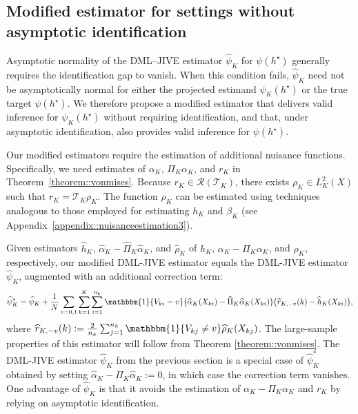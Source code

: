 \documentclass[11pt]{article}
\theoremstyle{plain}
\theoremstyle{definition}
\theoremstyle{remark}
\theoremstyle{definition}
\begin{document}
 


  
 


\subsection{Modified estimator for settings without asymptotic identification}
\label{sec::estimators2}

Asymptotic normality of the DML--JIVE estimator $\widehat{\psi}_K$ for $\psi(h^\star)$ generally requires the identification gap to vanish. When this condition fails, $\widehat{\psi}_K$ need not be asymptotically normal for either the projected estimand $\psi_K(h^\star)$ or the true target $\psi(h^\star)$. We therefore propose a modified estimator that delivers valid inference for $\psi_K(h^\star)$ without requiring identification, and that, under asymptotic identification, also provides valid inference for $\psi(h^\star)$.


Our modified estimators require the estimation of additional nuisance functions. Specifically, we need estimates of \( \alpha_K \), \( \Pi_K \alpha_K \), and \( r_K \) in Theorem~\ref{theorem::vonmises}. Because \( r_K \in \mathcal{R}(\mathcal{T}_K) \), there exists \( \rho_K \in L^2_K(X) \) such that \( r_K = \mathcal{T}_K \rho_K \). The function \( \rho_K \) can be estimated using techniques analogous to those employed for estimating \( h_K \) and \( \beta_K \) (see Appendix~\ref{appendix::nuisanceestimation3}).

 
Given estimators \( \widehat{h}_K \), \( \widehat{\alpha}_K - \widehat{\Pi}_K \widehat{\alpha}_K \), and \( \widehat{\rho}_K \) of \( h_K \), \( \alpha_K - \Pi_K \alpha_K \), and \( \rho_K \), respectively, our modified DML-JIVE estimator equals the DML-JIVE estimator \( \widehat{\psi}_K \), augmented with an additional correction term:
\begin{align*}
  \widehat{\psi}_K^*
  = \widehat{\psi}_K
  + \frac{1}{N} \sum_{v=0,1} \sum_{k=1}^K \sum_{i=1}^{n_k}
      \mathbbm{1}\{V_{ki} = v\}
      \bigl(\widehat{\alpha}_K(X_{ki}) - \widehat{\Pi}_K \widehat{\alpha}_K(X_{ki})\bigr)
      \bigl(\widehat{r}_{K,-v}(k) - \widehat{h}_K(X_{ki})\bigr),
\end{align*}
where \( \widehat{r}_{K,-v}(k) := \frac{2}{n_k} \sum_{j=1}^{n_k} \mathbbm{1}\{V_{kj} \neq v\} \widehat{\rho}_K(X_{kj}) \). The large-sample properties of this estimator will follow from Theorem \ref{theorem::vonmises}. The DML-JIVE estimator \( \widehat{\psi}_K \) from the previous section is a special case of \( \widehat{\psi}_K^* \) obtained by setting \( \widehat{\alpha}_K - \widehat{\Pi}_K \widehat{\alpha}_K := 0 \), in which case the correction term vanishes. One advantage of \( \widehat{\psi}_K \) is that it avoids the estimation of \( \alpha_K - \Pi_K \alpha_K \) and \( r_K \) by relying on asymptotic identification.
\end{document}
